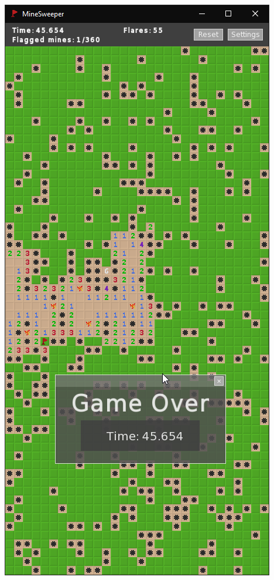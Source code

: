 \documentclass[12pt,a4paper]{article}
\begin{document}
\includegraphics[scale=0.45]{g3}
\end{document}
